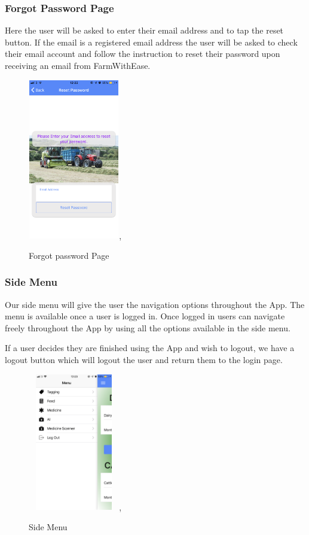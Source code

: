 \documentclass[12pt,a4paper,oneside,openany]{book}
\begin{document}
\newpage

\subsubsection{Forgot Password Page}
Here the user will be asked to enter their email address and to tap the reset button. If the email is a registered email address the user will be asked to check their email account and follow the instruction to reset their password upon receiving an email from FarmWithEase.

\begin{figure}[ht]
\renewcommand\thefigure{5.11}
\centering
\includegraphics[width=4cm,height=7cm]{Images/password.png},
\caption{Forgot password Page}
\label{password}
\end{figure}

\subsubsection{Side Menu}
Our side menu will give the user the navigation options throughout the App. The menu is available once a user is logged in. Once logged in users can navigate freely throughout the App by using all the options available in the side menu.

If a user decides they are finished using the App and wish to logout, we have a logout button which will logout the user and return them to the login page.

\begin{figure}[ht]
\renewcommand\thefigure{5.12}
\centering
\includegraphics[width=4cm,height=6cm]{Images/sideMenu.png},
\caption{Side Menu}
\label{menu}
\end{figure}
\end{document}
